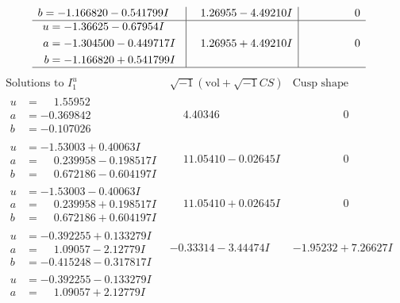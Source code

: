 \documentclass[1p]{elsarticle_modified}
\theoremstyle{definition}
\newcommand{\I}{\sqrt{-1}}
\begin{document}
$$\begin{array}{c|c|c}
\begin{aligned}
b &= -1.166820 - 0.541799 I\end{aligned}
 & \phantom{-}1.26955 - 4.49210 I & \phantom{-0.000000 } 0 \\ \hline\begin{aligned}
u &= -1.36625 - 0.67954 I \\
a &= -1.304500 - 0.449717 I \\
b &= -1.166820 + 0.541799 I\end{aligned}
 & \phantom{-}1.26955 + 4.49210 I & \phantom{-0.000000 } 0\\
 \hline 
 \end{array}$$\newpage$$\begin{array}{c|c|c}  
\text{Solutions to }I^u_{1}& \I (\text{vol} + \sqrt{-1}CS) & \text{Cusp shape}\\
 \hline 
\begin{aligned}
u &= \phantom{-}1.55952\phantom{ +0.000000I} \\
a &= -0.369842\phantom{ +0.000000I} \\
b &= -0.107026\phantom{ +0.000000I}\end{aligned}
 & \phantom{-}4.40346\phantom{ +0.000000I} & \phantom{-0.000000 } 0 \\ \hline\begin{aligned}
u &= -1.53003 + 0.40063 I \\
a &= \phantom{-}0.239958 - 0.198517 I \\
b &= \phantom{-}0.672186 - 0.604197 I\end{aligned}
 & \phantom{-}11.05410 - 0.02645 I & \phantom{-0.000000 } 0 \\ \hline\begin{aligned}
u &= -1.53003 - 0.40063 I \\
a &= \phantom{-}0.239958 + 0.198517 I \\
b &= \phantom{-}0.672186 + 0.604197 I\end{aligned}
 & \phantom{-}11.05410 + 0.02645 I & \phantom{-0.000000 } 0 \\ \hline\begin{aligned}
u &= -0.392255 + 0.133279 I \\
a &= \phantom{-}1.09057 - 2.12779 I \\
b &= -0.415248 - 0.317817 I\end{aligned}
 & -0.33314 - 3.44474 I & -1.95232 + 7.26627 I \\ \hline\begin{aligned}
u &= -0.392255 - 0.133279 I \\
a &= \phantom{-}1.09057 + 2.12779 I \\

\end{aligned}
\end{array}$$
\end{document}
